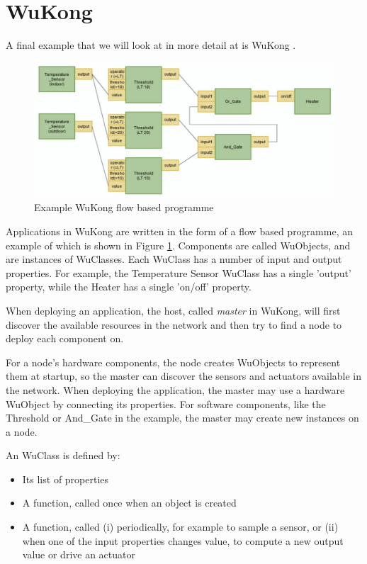 \section{WuKong}
\label{sec-state-of-the-art-wukong}
A final example that we will look at in more detail at is WuKong \cite{Reijers:2013ut, Lin:2013dc}.


\begin{figure}
\centering
\includegraphics[width=0.8\linewidth]{wukong-fbp.png}
\caption{Example WuKong flow based programme}
\label{fig-wukong-fbp}
\end{figure}


Applications in WuKong are written in the form of a flow based programme, an example of which is shown in Figure \ref{fig-wukong-fbp}. Components are called WuObjects, and are instances of WuClasses. Each WuClass has a number of input and output properties. For example, the Temperature Sensor WuClass has a single 'output' property, while the Heater has a single 'on/off' property.

When deploying an application, the host, called \emph{master} in WuKong, will first discover the available resources in the network and then try to find a node to deploy each component on.

For a node's hardware components, the node creates WuObjects to represent them at startup, so the master can discover the sensors and actuators available in the network. When deploying the application, the master may use a hardware WuObject by connecting its properties. For software components, like the Threshold or And\_Gate in the example, the master may create new instances on a node.

An WuClass is defined by:
\begin{itemize}
    \item Its list of properties
    \item A  function, called once when an object is created
    \item A  function, called (i) periodically, for example to sample a sensor, or (ii) when one of the input properties changes value, to compute a new output value or drive an actuator
\end{itemize}


